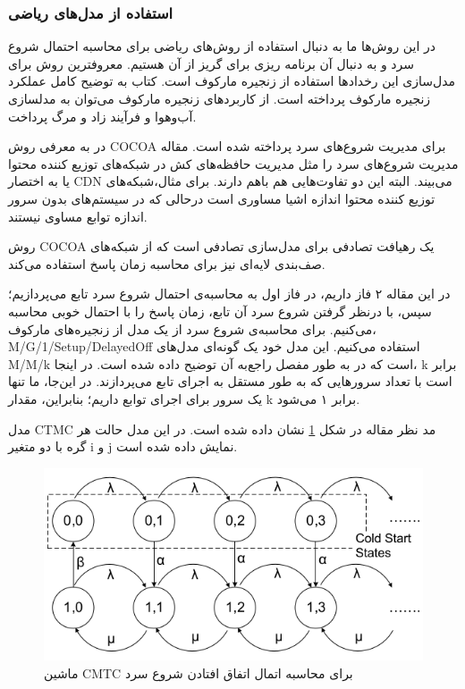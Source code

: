 \subsubsection{استفاده از مدل‌های ریاضی }

در این روش‌ها ما به دنبال استفاده از روش‌های ریاضی برای محاسبه احتمال شروع سرد و به دنبال آن برنامه ریزی برای گریز از آن هستیم. معروفترین روش برای مدل‌سازی این رخدادها استفاده از زنجیره مارکوف است. کتاب \cite{brooks2011handbook} به توضیح کامل عملکرد زنجیره مارکوف پرداخته است. از کاربرد‌های زنجیره مارکوف می‌توان به مدلسازی آب‌وهوا و فرآیند زاد و مرگ پرداخت.\cite{brooks2011handbook} 

در \cite{gias2020cocoa} به معرفی روش COCOA برای مدیریت شروع‌های سرد پرداخته شده است. مقاله مدیریت شروع‌های سرد را مثل مدیریت حافظه‌های کش در شبکه‌های توزیع کننده محتوا یا به اختصار CDN می‌بیند. البته این دو تفاوت‌هایی هم باهم دارند. برای مثال،‌شبکه‌های توزیع کننده محتوا اندازه اشیا‌ مساوری است درحالی که در سیستم‌های بدون سرور اندازه توابع مساوی نیستند. 

روش COCOA یک رهیافت تصادفی برای مدل‌سازی تصادفی  است که از شبکه‌های صف‌بندی لایه‌ای نیز برای محاسبه زمان پاسخ استفاده می‌کند. 

در این مقاله ۲ فاز داریم، در فاز اول به محاسبه‌ی احتمال شروع سرد تابع می‌پردازیم؛ سپس، با درنظر گرفتن شروع سرد آن تابع، زمان پاسخ را با احتمال خوبی محاسبه می‌کنیم. برای محاسبه‌ی شروع سرد از یک مدل از زنجیره‌های مارکوف، M/G/1/Setup/DelayedOff استفاده می‌کنیم. این مدل خود یک گونه‌ای مدل‌های M/M/k است که در \cite{gandhi2013exact} به طور مفصل راجع‌به آن توضیح داده شده است. در اینجا، k برابر است با تعداد سرور‌هایی که به طور مستقل به اجرای تابع می‌پردازند. در این‌جا، ما تنها یک سرور برای اجرای توابع داریم؛ بنابراین، مقدار k برابر ۱ می‌شود. 

مدل CTMC مد نظر مقاله در شکل \ref{fig:COCOA-CMTC} نشان داده شده است. در این مدل حالت هر گره با دو متغیر i و j نمایش داده شده است. 

\begin{figure}
	\centering
	\includegraphics[width=\linewidth]{figs/COCOA-CMTC}
	\caption {ماشین CMTC برای  محاسبه اتمال اتفاق افتادن شروع سرد}
	\label{fig:COCOA-CMTC}
\end{figure}

